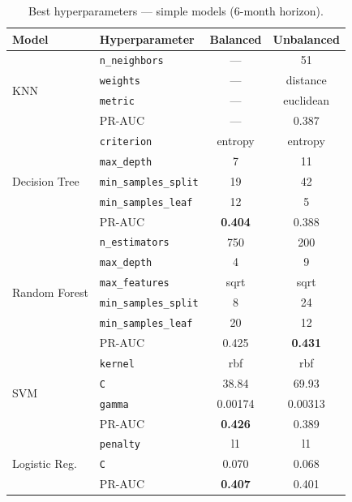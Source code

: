 \begin{table}[htbp]
\centering
\caption[Best hyperparameters: simple models]{Best hyperparameters --- simple models (6-month horizon).}
\label{tab:best_simple}
\small
\begin{tabular}{l l c c}
\toprule
\textbf{Model} & \textbf{Hyperparameter} & \textbf{Balanced} & \textbf{Unbalanced} \\
\midrule
\multirow{4}{*}{KNN}
  & \texttt{n\_neighbors}      & ---   & 51 \\
  & \texttt{weights}           & ---   & distance \\
  & \texttt{metric}            & ---   & euclidean \\
  & PR-AUC                     & ---   & 0.387 \\
\midrule
\multirow{5}{*}{Decision Tree}
  & \texttt{criterion}         & entropy & entropy \\
  & \texttt{max\_depth}        & 7       & 11 \\
  & \texttt{min\_samples\_split} & 19    & 42 \\
  & \texttt{min\_samples\_leaf}  & 12    & 5 \\
  & PR-AUC                     & \textbf{0.404} & 0.388 \\
\midrule
\multirow{6}{*}{Random Forest}
  & \texttt{n\_estimators}     & 750   & 200 \\
  & \texttt{max\_depth}        & 4     & 9 \\
  & \texttt{max\_features}     & sqrt  & sqrt \\
  & \texttt{min\_samples\_split} & 8   & 24 \\
  & \texttt{min\_samples\_leaf}  & 20  & 12 \\
  & PR-AUC                     & 0.425 & \textbf{0.431} \\
\midrule
\multirow{4}{*}{SVM}
  & \texttt{kernel}            & rbf     & rbf \\
  & \texttt{C}                 & 38.84   & 69.93 \\
  & \texttt{gamma}             & 0.00174 & 0.00313 \\
  & PR-AUC                     & \textbf{0.426} & 0.389 \\
\midrule
\multirow{3}{*}{Logistic Reg.}
  & \texttt{penalty}           & l1    & l1 \\
  & \texttt{C}                 & 0.070 & 0.068 \\
  & PR-AUC                     & \textbf{0.407} & 0.401 \\
\bottomrule
\end{tabular}
\end{table}


